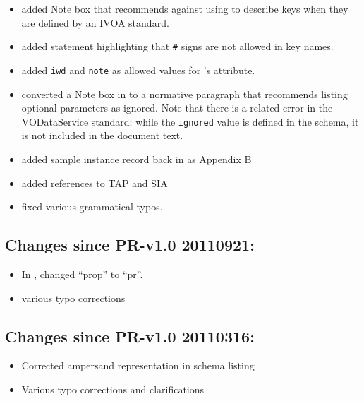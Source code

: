 \documentclass[11pt,a4paper]{ivoa}
\begin{document}
\begin{itemize}
\item  added Note box that recommends against using 
        to
       describe keys when they are defined by an IVOA standard.

\item  added statement highlighting that \verb|#| signs are
       not allowed in key names.

\item  added \texttt{iwd} and \texttt{note} as allowed values
       for 's
        attribute.

\item  converted a Note box in to a normative paragraph
       that recommends listing optional 
       parameters as ignored.  Note that there is a related error in
       the VODataService standard: while
       the \texttt{ignored} value is defined in
       the schema, it is not included in the document text.

\item  added sample 
       instance record back in as Appendix B

\item  added references to TAP and SIA

\item  fixed various grammatical typos.

\end{itemize}

\subsection{Changes since PR-v1.0 20110921:}

\begin{itemize}

\item  In , changed ``prop'' to ``pr''.

\item  various typo corrections

\end{itemize}

\subsection{Changes since PR-v1.0 20110316:}

\begin{itemize}

\item Corrected ampersand representation in schema listing

\item Various typo corrections and clarifications

\end{itemize}
\end{document}
